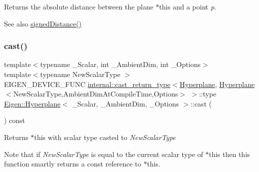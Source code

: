 \begin{DoxyReturn}{Returns}
the absolute distance between the plane {\ttfamily $\ast$this} and a point {\itshape p}. 
\end{DoxyReturn}
\begin{DoxySeeAlso}{See also}
\mbox{\hyperlink{class_eigen_1_1_hyperplane_a928f4f8a7c2eb339fe8c931824d0a8c8}{signed\+Distance()}} 
\end{DoxySeeAlso}
\mbox{\label{class_eigen_1_1_hyperplane_aa3b0071864745e33f3a7b75bb308bd46}} 
\subsubsection{\texorpdfstring{cast()}{cast()}}
{\footnotesize\ttfamily template$<$typename \+\_\+\+Scalar, int \+\_\+\+Ambient\+Dim, int \+\_\+\+Options$>$ \\
template$<$typename New\+Scalar\+Type $>$ \\
E\+I\+G\+E\+N\+\_\+\+D\+E\+V\+I\+C\+E\+\_\+\+F\+U\+NC \mbox{\hyperlink{struct_eigen_1_1internal_1_1cast__return__type}{internal\+::cast\+\_\+return\+\_\+type}}$<$\mbox{\hyperlink{class_eigen_1_1_hyperplane}{Hyperplane}}, \mbox{\hyperlink{class_eigen_1_1_hyperplane}{Hyperplane}}$<$New\+Scalar\+Type,Ambient\+Dim\+At\+Compile\+Time,Options$>$ $>$\+::type \mbox{\hyperlink{class_eigen_1_1_hyperplane}{Eigen\+::\+Hyperplane}}$<$ \+\_\+\+Scalar, \+\_\+\+Ambient\+Dim, \+\_\+\+Options $>$\+::cast (\begin{DoxyParamCaption}{ }\end{DoxyParamCaption}) const\hspace{0.3cm}{\ttfamily [inline]}}

\begin{DoxyReturn}{Returns}
{\ttfamily $\ast$this} with scalar type casted to {\itshape New\+Scalar\+Type} 
\end{DoxyReturn}
Note that if {\itshape New\+Scalar\+Type} is equal to the current scalar type of {\ttfamily $\ast$this} then this function smartly returns a const reference to {\ttfamily $\ast$this}. \mbox{\label{class_eigen_1_1_hyperplane_ae9e0a6a6a2c1643a788770dd08e89b3f}} 
